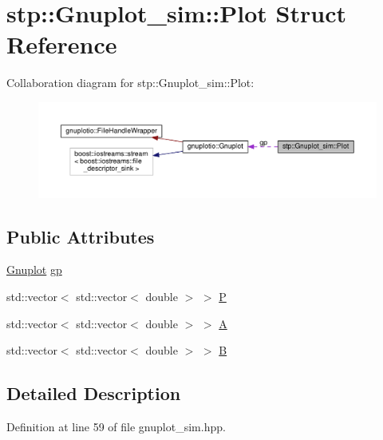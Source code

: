 \hypertarget{structstp_1_1_gnuplot__sim_1_1_plot}{}\section{stp\+:\+:Gnuplot\+\_\+sim\+:\+:Plot Struct Reference}
\label{structstp_1_1_gnuplot__sim_1_1_plot}


Collaboration diagram for stp\+:\+:Gnuplot\+\_\+sim\+:\+:Plot\+:
\nopagebreak
\begin{figure}[H]
\begin{center}
\leavevmode
\includegraphics[width=350pt]{structstp_1_1_gnuplot__sim_1_1_plot__coll__graph}
\end{center}
\end{figure}
\subsection*{Public Attributes}
\begin{DoxyCompactItemize}
\item 
\hyperlink{classgnuplotio_1_1_gnuplot}{Gnuplot} \hyperlink{structstp_1_1_gnuplot__sim_1_1_plot_ad0c15571b7ebf84061341863e00f4dd6}{gp}
\item 
std\+::vector$<$ std\+::vector$<$ double $>$ $>$ \hyperlink{structstp_1_1_gnuplot__sim_1_1_plot_acb7e4715a9d62a66ce7b1228e46fc75d}{P}
\item 
std\+::vector$<$ std\+::vector$<$ double $>$ $>$ \hyperlink{structstp_1_1_gnuplot__sim_1_1_plot_a81f7c65e2f66254a85f70a58cf285f73}{A}
\item 
std\+::vector$<$ std\+::vector$<$ double $>$ $>$ \hyperlink{structstp_1_1_gnuplot__sim_1_1_plot_a097858b4b2ff6da39924ee9c1427e8b0}{B}
\end{DoxyCompactItemize}


\subsection{Detailed Description}


Definition at line 59 of file gnuplot\+\_\+sim.\+hpp.



